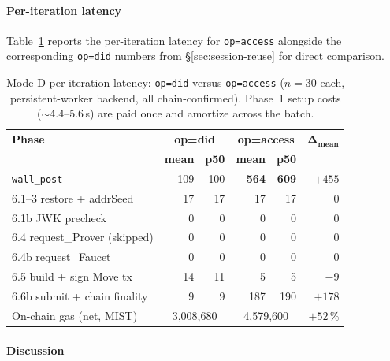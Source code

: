 \paragraph{Per-iteration latency}

Table~\ref{tab:ehr-access-vs-did} reports the per-iteration latency for
\texttt{op=access} alongside the corresponding \texttt{op=did} numbers
from \S\ref{sec:session-reuse} for direct comparison.

\begin{table}[h]
\centering
\small
\caption{Mode D per-iteration latency: \texttt{op=did} versus
\texttt{op=access} ($n=30$ each, persistent-worker backend, all
chain-confirmed). Phase~1 setup costs (\(\sim\)4.4--5.6\,s) are paid once and amortize across the batch.}
\label{tab:ehr-access-vs-did}
\begin{tabular}{lrrrrr}
\toprule
\textbf{Phase}             & \multicolumn{2}{c}{\textbf{op=did}}
                           & \multicolumn{2}{c}{\textbf{op=access}}
                           & \(\boldsymbol{\Delta_{\text{mean}}}\) \\
                           & \textbf{mean} & \textbf{p50}
                           & \textbf{mean} & \textbf{p50}
                           & \\
\midrule
\texttt{wall\_post}              & 109 & 100 & \textbf{564} & \textbf{609} & $+455$ \\
6.1--3 restore + addrSeed        &  17 &  17 &  17 &  17 &   $0$ \\
6.1b  JWK precheck               &   0 &   0 &   0 &   0 &   $0$ \\
6.4   request\_Prover (skipped)  &   0 &   0 &   0 &   0 &   $0$ \\
6.4b  request\_Faucet            &   0 &   0 &   0 &   0 &   $0$ \\
6.5   build + sign Move tx       &  14 &  11 &   5 &   5 &   $-9$ \\
6.6b  submit + chain finality    &   9 &   9 & 187 & 190 & $+178$ \\
\midrule
On-chain gas (net, MIST)         & \multicolumn{2}{c}{3{,}008{,}680} & \multicolumn{2}{c}{4{,}579{,}600} & $+52\,\%$ \\
\bottomrule
\end{tabular}
\end{table}

\paragraph{Discussion}

